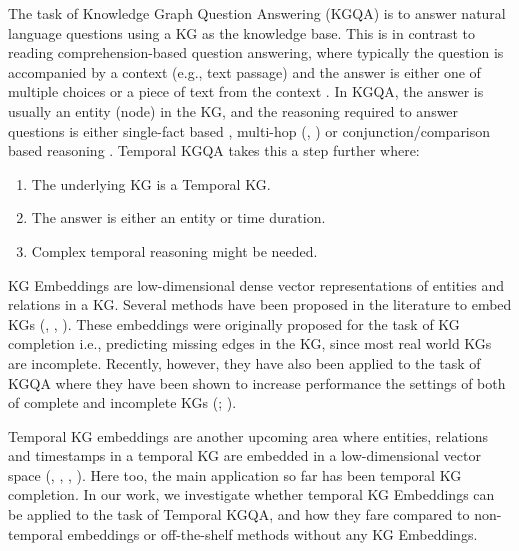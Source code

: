 \documentclass[11pt,a4paper]{article}
\begin{document}
The task of Knowledge Graph Question Answering (KGQA) is to answer natural language questions using a KG as the knowledge base. This is in contrast to reading comprehension-based question answering, where typically the question is accompanied by a context (e.g., text passage) and the answer is either one of multiple choices \citep{rajpurkar2016squad} or a piece of text from the context \citep{yang2018hotpotqa}. In KGQA, the answer is usually an entity (node) in the KG, and the reasoning required to answer questions is either single-fact based \citep{bordes2015large}, multi-hop (\citealt{yih-etal-2015-semantic}, \citealt{zhang2017variational}) or conjunction/comparison based reasoning \citep{talmor-berant-2018-web}. Temporal KGQA takes this a step further where:
\begin{enumerate}
    \item The underlying KG is a Temporal KG.
    \item The answer is either an entity or time duration.
    \item Complex temporal reasoning might be needed.
\end{enumerate}
\vspace{1mm}


KG Embeddings are low-dimensional dense vector representations of entities and relations in a KG. Several methods have been proposed in the literature to embed KGs (\citealt{bordes2013translating}, \citealt{trouillon2016complex}, \citealt{vashishth2020interacte}). These embeddings were originally proposed for the task of KG completion i.e.,  predicting missing edges in the KG, since most real world KGs are incomplete. Recently, however, they have also been applied to the task of KGQA where they have been shown to increase performance the settings of both of complete and incomplete KGs (\citealt{saxena-etal-2020-improving}; \citealt{sun2020faithful}). 

Temporal KG embeddings are another upcoming area where entities, relations and timestamps in a temporal KG are embedded in a low-dimensional vector space (\citealt{dasgupta-etal-2018-hyte}, \citealt{lacroix2020tntcomplex}, \citealt{jain-etal-2020-temporal}, \citealt{goel2019diachronic}). Here too, the main application so far has been temporal KG completion. In our work, we investigate whether temporal KG Embeddings can be applied to the task of Temporal KGQA, and how they fare compared to non-temporal embeddings or off-the-shelf methods without any KG Embeddings.
\end{document}
